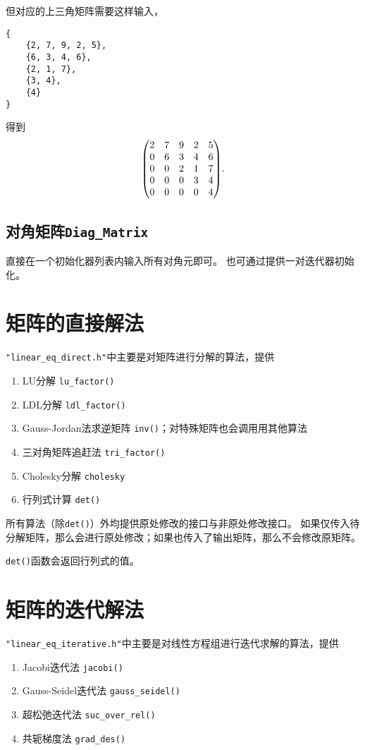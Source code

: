 但对应的上三角矩阵需要这样输入，
{\small
\begin{verbatim}
{
    {2, 7, 9, 2, 5},
    {6, 3, 4, 6},
    {2, 1, 7},
    {3, 4},
    {4}
}
\end{verbatim}
}
得到\[
    \mqty(
        2&7&9&2&5\\
        0&6&3&4&6\\
        0&0&2&1&7\\
        0&0&0&3&4\\
        0&0&0&0&4
    ).
\]

\subsection{对角矩阵\texttt{Diag\_Matrix}}
直接在一个初始化器列表内输入所有对角元即可。
也可通过提供一对迭代器初始化。

\section{矩阵的直接解法}
\texttt{"linear\_eq\_direct.h"}中主要是对矩阵进行分解的算法，提供\begin{enumerate}
    \item LU分解 \texttt{lu\_factor()}
    \item LDL分解 \texttt{ldl\_factor()}
    \item Gauss-Jordan法求逆矩阵 \texttt{inv()}；对特殊矩阵也会调用用其他算法
    \item 三对角矩阵追赶法 \texttt{tri\_factor()}
    \item Cholesky分解 \texttt{cholesky}
    \item 行列式计算 \texttt{det()}
\end{enumerate}

所有算法（除\texttt{det()}）外均提供原处修改的接口与非原处修改接口。
如果仅传入待分解矩阵，那么会进行原处修改；如果也传入了输出矩阵，那么不会修改原矩阵。

\texttt{det()}函数会返回行列式的值。

\section{矩阵的迭代解法}
\texttt{"linear\_eq\_iterative.h"}中主要是对线性方程组进行迭代求解的算法，提供\begin{enumerate}
    \item Jacobi迭代法 \texttt{jacobi()}
    \item Gauss-Seidel迭代法 \texttt{gauss\_seidel()}
    \item 超松弛迭代法 \texttt{suc\_over\_rel()}
    \item 共轭梯度法 \texttt{grad\_des()}
\end{enumerate}

